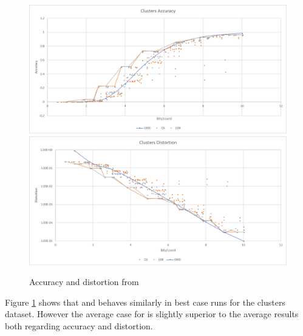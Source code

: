 \begin{figure}[h!]
\includegraphics[width=\textwidth]{figures/graphs/clusters_accuracy}
\includegraphics[width=\textwidth]{figures/graphs/clusters_distortion}
\caption{Accuracy and distortion from \clust{}}
\label{fig:graph clust}
\end{figure}
Figure \ref{fig:graph clust} shows that \qs{} and \qsr{} behaves similarly in best case runs for the clusters dataset. However the average case for \qsr{} is slightly superior to the \qs{} average results both regarding accuracy and distortion.
\clearpage
